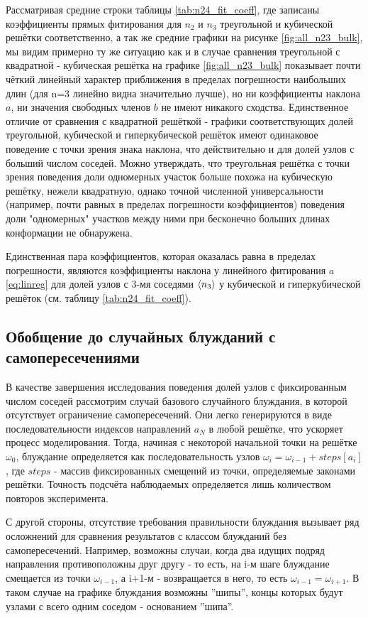 Рассматривая средние строки таблицы \ref{tab:n24_fit_coeff}, где записаны коэффициенты прямых фитирования для $n_{2}$ и $n_{3}$ треугольной и кубической решётки соответственно, а так же средние графики на рисунке \ref{fig:all_n23_bulk}, мы видим примерно ту же ситуацию как и в случае сравнения треугольной с квадратной - кубическая решётка на графике \ref{fig:all_n23_bulk} показывает почти чёткий линейный характер приближения в пределах погрешности наибольших длин (для n=3 линейно видна значительно лучше), но ни коэффициенты наклона $a$, ни значения свободных членов $b$ не имеют никакого сходства. Единственное отличие от сравнения с квадратной решёткой - графики соответствующих долей треугольной, кубической и гиперкубической решёток имеют одинаковое поведение с точки зрения знака наклона, что действительно и для долей узлов с больший числом соседей. Можно утверждать, что треугольная решётка с точки зрения поведения доли одномерных участок больше похожа на кубическую решётку, нежели квадратную, однако точной численной универсальности (например, почти равных в пределах погрешности коэффициентов) поведения доли "одномерных" участков между ними при бесконечно больших длинах конформации не обнаружена.

Единственная пара коэффициентов, которая оказалась равна в пределах погрешности, являются коэффициенты наклона у линейного фитирования $a$ \eqref{eq:linreg} для долей узлов с 3-мя соседями $\langle n_{3} \rangle$ у кубической и гиперкубической решёток (см. таблицу \ref{tab:n24_fit_coeff}).

\subsection{Обобщение до случайных блужданий с самопересечениями}

В качестве завершения исследования поведения долей узлов с фиксированным числом соседей рассмотрим случай базового случайного блуждания, в которой отсутствует ограничение самопересечений. Они легко генерируются в виде последовательности индексов направлений $ {a_{N}} $ в любой решётке, что ускоряет процесс моделирования. Тогда, начиная с некоторой начальной точки на решётке $\omega_{0}$, блуждание определяется как последовательность узлов $ 
\omega_{i} = \omega_{i-1} + steps\left[a_{i}\right] $, где $steps$ - массив фиксированных смещений из точки, определяемые законами решётки. Точность подсчёта наблюдаемых определяется лишь количеством повторов эксперимента.

С другой стороны, отсутствие требования правильности блуждания вызывает ряд осложнений для сравнения результатов с классом блужданий без самопересечений. Например, возможны случаи, когда два идущих подряд направления противоположны друг другу - то есть, на i-м шаге блуждание смещается из точки $\omega_{i-1}$, а i+1-м - возвращается в него, то есть $\omega_{i-1} = \omega_{i+1}$. В таком случае на графике блуждания возможны ''шипы'', концы которых будут узлами с всего одним соседом - основанием ''шипа''. 

